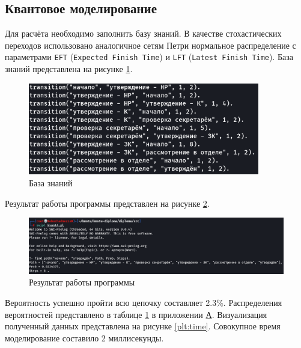 \subsection{Квантовое моделирование}

Для расчёта необходимо заполнить базу знаний. В качестве стохастических переходов использовано аналогичное сетям Петри нормальное распределение с параметрами \texttt{EFT} (\texttt{Expected Finish Time}) и \texttt{LFT} (\texttt{Latest Finish Time}). База знаний представлена на рисунке \ref{fig:knowledge}.

\begin{figure}[h!btp]
	\centering
	\includegraphics[width=0.9\textwidth]{inc/knowledge.png}
	\caption{База знаний}
	\label{fig:knowledge}
\end{figure}

\pagebreak

Результат работы программы представлен на рисунке \ref{fig:res}.

\begin{figure}[h!]
	\centering
	\includegraphics[width=\textwidth]{inc/res.png}
	\caption{Результат работы программы}
	\label{fig:res}
\end{figure}

Вероятность успешно пройти всю цепочку составляет 2.3\%. Распределения вероятностей представлено в таблице \hyperref[tab:distrib]{1} в приложении \hyperref[app:table]{А}. Визуализация полученный данных представлена на рисунке \ref{plt:time}. Совокупное время моделирование составило 2 миллисекунды.

